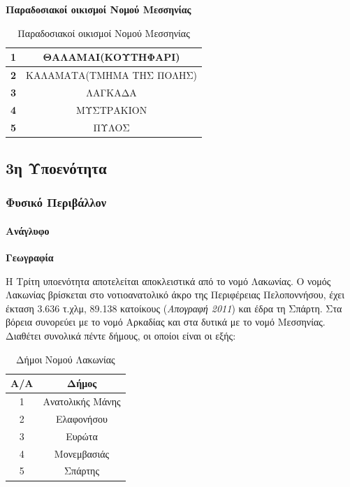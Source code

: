 \documentclass[12pt]{article}
\begin{document}
	\textbf{Παραδοσιακοί οικισμοί Νομού Μεσσηνίας}
	
	\begin{table}[H]
		\centering
		\begin{tabular}{|c|c|}
			\hline
			\textbf{1} & ΘΑΛΑΜΑΙ(ΚΟΥΤΗΦΑΡΙ) \\ \hline
			\textbf{2} & ΚΑΛΑΜΑΤΑ(ΤΜΗΜΑ ΤΗΣ ΠΟΛΗΣ) \\ \hline
			\textbf{3} & ΛΑΓΚΑΔΑ \\ \hline
			\textbf{4} & ΜΥΣΤΡΑΚΙΟΝ \\ \hline
			\textbf{5} & ΠΥΛΟΣ \\ \hline
		\end{tabular}
		\caption{Παραδοσιακοί οικισμοί Νομού Μεσσηνίας}
		\label{The label}
	\end{table}
	
	\subsection{3η Υποενότητα}
	
	\subsubsection{Φυσικό Περιβάλλον}
	
	\paragraph{Ανάγλυφο}
	
	\textbf{Γεωγραφία}
	
	Η Τρίτη υποενότητα αποτελείται αποκλειστικά από το νομό Λακωνίας. Ο νομός Λακωνίας βρίσκεται στο νοτιοανατολικό άκρο της Περιφέρειας Πελοποννήσου, έχει έκταση 3.636 τ.χλμ, 89.138 κατοίκους (\emph{Απογραφή 2011}) και έδρα τη Σπάρτη. Στα βόρεια συνορεύει με το νομό Αρκαδίας και στα δυτικά με το νομό Μεσσηνίας. Διαθέτει συνολικά πέντε δήμους, οι οποίοι είναι οι εξής:
	
	\begin{table}[H]
		\centering
		\begin{tabular}{|c|c|}
			\hline
			\textbf{Α/Α} & \textbf{Δήμος} \\ \hline
			1 & Ανατολικής Μάνης \\ \hline
			2 & Ελαφονήσου \\ \hline
			3 & Ευρώτα \\ \hline
			4 & Μονεμβασιάς \\ \hline
			5 & Σπάρτης \\ \hline
		\end{tabular}
		\caption{Δήμοι Νομού Λακωνίας}
		\label{The label}
	\end{table}
	
\end{document}
